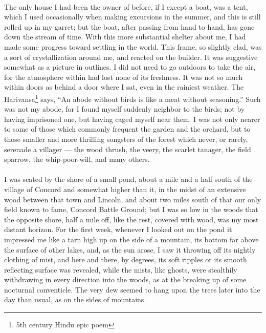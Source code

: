 \documentclass[letterpaper,12pt]{article}
\begin{document}
\paragraph{} The only house I had been the owner of before, if I except a boat,
was a tent, which I used occasionally when making excursions in the summer, and
this is still rolled up in my garret; but the boat, after passing from hand to
hand, has gone down the stream of time. With this more substantial shelter about
me, I had made some progress toward settling in the world. This frame, so
slightly clad, was a sort of crystallization around me, and reacted on the
builder. It was suggestive somewhat as a picture in outlines. I did not need to
go outdoors to take the air, for the atmosphere within had lost none of its
freshness. It was not so much within doors as behind a door where I sat, even in
the rainiest weather. The Harivansa\footnote{5th century Hindu epic poem} says,
\enquote{An abode without birds is like a meat without seasoning.} Such was not
my abode, for I found myself suddenly neighbor to the birds; not by having
imprisoned one, but having caged myself near them. I was not only nearer to some
of those which commonly frequent the garden and the orchard, but to those
smaller and more thrilling songsters of the forest which never, or rarely,
serenade a villager --- the wood thrush, the veery, the scarlet tanager, the
field sparrow, the whip-poor-will, and many others.

\paragraph{} I was seated by the shore of a small pond, about a mile and a half
south of the village of Concord and somewhat higher than it, in the midst of an
extensive wood between that town and Lincoln, and about two miles south of that
our only field known to fame, Concord Battle Ground; but I was so low in the
woods that the opposite shore, half a mile off, like the rest, covered with
wood, was my most distant horizon. For the first week, whenever I looked out on
the pond it impressed me like a tarn high up on the side of a mountain, its
bottom far above the surface of other lakes, and, as the sun arose, I saw it
throwing off its nightly clothing of mist, and here and there, by degrees, its
soft ripples or its smooth reflecting surface was revealed, while the mists,
like ghosts, were stealthily withdrawing in every direction into the woods, as
at the breaking up of some nocturnal conventicle. The very dew seemed to hang
upon the trees later into the day than usual, as on the sides of mountains.
\end{document}
